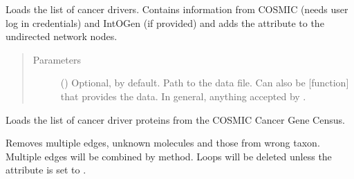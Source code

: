 \documentclass[letterpaper,10pt,english]{sphinxmanual}
\begin{document}
\begin{fulllineitems}
\begin{fulllineitems}
\label{\detokenize{main:pypath.main.PyPath.cancer_drivers_list}}
Loads the list of cancer drivers. Contains information from
COSMIC (needs user log in credentials) and IntOGen (if provided)
and adds the attribute to the undirected network nodes.
\begin{quote}\begin{description}
\item[{Parameters}] \leavevmode
{} () \textendash{} Optional,  by default. Path to the data file. Can
also be {[}function{]} that provides the data. In general,
anything accepted by
.

\end{description}\end{quote}

\end{fulllineitems}


\begin{fulllineitems}
\label{\detokenize{main:pypath.main.PyPath.cancer_gene_census_list}}
Loads the list of cancer driver proteins from the COSMIC Cancer
Gene Census.

\end{fulllineitems}


\begin{fulllineitems}
\label{\detokenize{main:pypath.main.PyPath.clean_graph}}
Removes multiple edges, unknown molecules and those from wrong
taxon. Multiple edges will be combined by
{\hyperref[\detokenize{main:pypath.main.PyPath.combine_attr}]{}} method.
Loops will be deleted unless the attribute
 is set to .

\end{fulllineitems}


\end{fulllineitems}
\end{document}
